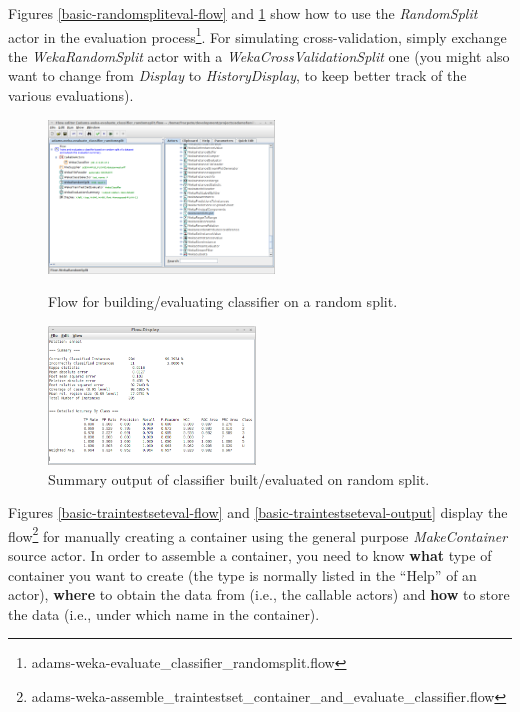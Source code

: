 Figures \ref{basic-randomspliteval-flow} and \ref{basic-randomspliteval-output}
show how to use the \textit{RandomSplit} actor in the evaluation
process\footnote{adams-weka-evaluate\_classifier\_randomsplit.flow}. For
simulating cross-validation, simply exchange the \textit{WekaRandomSplit} actor
with a \textit{WekaCrossValidationSplit} one (you might also want to change from
\textit{Display} to \textit{HistoryDisplay}, to keep better track of the various
evaluations).

\begin{figure}[ht]
  \begin{minipage}[t]{0.5\linewidth}
    \centering
    \includegraphics[width=6.0cm]{images/basic-randomspliteval-flow.png}
    \caption{Flow for building/evaluating classifier on a random split.}
    \label{basic-randomspliteval-flow}
  \end{minipage}
  \hspace{0.5cm}
  \begin{minipage}[t]{0.5\linewidth}
    \centering
    \includegraphics[width=5.5cm]{images/basic-randomspliteval-output.png}
    \caption{Summary output of classifier built/evaluated on random split.}
    \label{basic-randomspliteval-output}
  \end{minipage}
\end{figure}

Figures \ref{basic-traintestseteval-flow} and
\ref{basic-traintestseteval-output} display the flow\footnote{adams-weka-assemble\_traintestset\_container\_and\_evaluate\_classifier.flow}
for manually creating a container using the general purpose
\textit{MakeContainer} source actor. In order to assemble a container, you need
to know \textbf{what} type of container you want to create (the type is normally
listed in the ``Help'' of an actor), \textbf{where} to obtain the data from
(i.e., the callable actors) and \textbf{how} to store the data (i.e., under which
name in the container).

